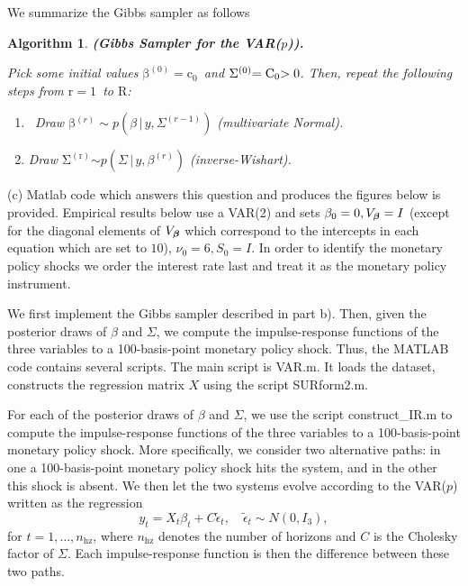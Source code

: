 \documentclass{article}
\newtheorem{algorithm}[theorem]{Algorithm}
\begin{document}
We summarize the Gibbs sampler as follows

\begin{algorithm}
\textrm{\textbf{(Gibbs Sampler for the VAR($p$)).} }

\textrm{Pick some initial values }$\mathrm{\beta }^{\mathrm{(0)}}\mathrm{=c}%
_{\mathrm{0}}$\textrm{\ and }$\mathrm{\Sigma }^{\mathrm{(0)}}\mathrm{=C}_{%
\mathrm{0}}\mathrm{>0}$\textrm{. Then, repeat the following steps from }$%
\mathrm{r=1}$\textrm{\ to }$\mathrm{R}$\textrm{: }

\begin{enumerate}
\item \textrm{\ Draw }$\mathrm{\beta }$\textrm{$^{(r)}\sim p(\beta
\,|\,y,\Sigma ^{(r-1)})$ (multivariate Normal). }

\item \textrm{Draw }$\mathrm{\Sigma }^{\mathrm{(r)}}$\textrm{$\sim p(\Sigma
\,|\,y,\beta ^{(r)})$ (inverse-Wishart). }
\end{enumerate}
\end{algorithm}

(c) Matlab code which answers this question and produces the figures below
is provided. Empirical results below use a VAR(2) and sets $\beta _{0}=0,V_{%
\boldsymbol{\beta }}=I$ (except for the diagonal elements of $V_{\boldsymbol{%
\beta }}$ which correspond to the intercepts in each equation which are set
to $10$), $\nu _{0}=6,S_{0}=I$. In order to identify the monetary policy
shocks we order the interest rate last and treat it as the monetary policy
instrument.

We first implement the Gibbs sampler described in part b). Then, given the
posterior draws of $\beta $ and $\Sigma $, we compute the impulse-response
functions of the three variables to a 100-basis-point monetary policy shock.
Thus, the MATLAB code contains several scripts. The main script is VAR.m. It
loads the dataset, constructs the regression matrix $X$ using the script
SURform2.m.

For each of the posterior draws of $\beta $ and $\Sigma $, we use the script
construct\_IR.m to compute the impulse-response functions of the three
variables to a 100-basis-point monetary policy shock. More specifically, we
consider two alternative paths: in one a 100-basis-point monetary policy
shock hits the system, and in the other this shock is absent. We then let
the two systems evolve according to the VAR($p$) written as the regression 
\begin{equation*}
y_{t}=X_{t}\beta _{t}+C\tilde{\epsilon}_{t},\quad \tilde{\epsilon}_{t}\sim
N(0,I_{3}),
\end{equation*}%
for $t=1,\ldots ,n_{\mathrm{hz}}$, where $n_{\mathrm{hz}}$ denotes the
number of horizons and $C$ is the Cholesky factor of $\Sigma $. Each
impulse-response function is then the difference between these two paths.
\end{document}
